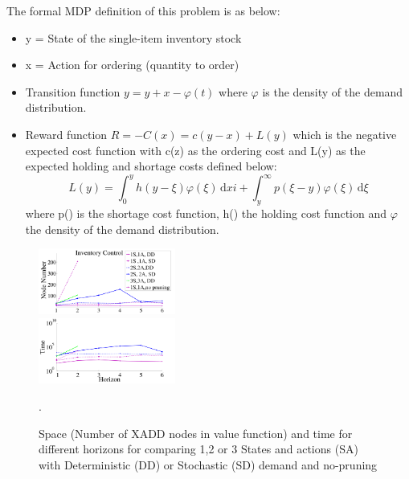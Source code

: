 The formal MDP definition of this problem is as below:
\begin{itemize}
\item y = State of the single-item inventory stock
\item x = Action for ordering (quantity to order) 
\item Transition function $y = y + x - \varphi(t) $ where $\varphi$ is the density of the demand distribution.
\item Reward function $R = -C(x) = c(y-x)+L(y)$ which is the negative expected cost function with c(z) as the ordering cost and L(y) as the expected holding and shortage costs defined below: 
\[ 
L(y) =\int_0^y \! h(y-\xi)\varphi(\xi) \, \mathrm{d} xi + \int_y^{\infty} \! p(\xi - y)\varphi(\xi) \, \mathrm{d} \xi 
\]
where p() is the shortage cost function, h() the holding cost function and $\varphi$ the density of the demand distribution. 
\end{itemize}


\begin{figure}[t]
\includegraphics[width=0.4\textwidth]{new_pics/space1.pdf}\\
\includegraphics[width=0.4\textwidth]{new_pics/time1.pdf}
\vspace{-2mm}
\caption{\footnotesize Space (Number of XADD nodes in value function) 
and time for different horizons for \InventoryControl comparing 
1,2 or 3 States and actions (SA) with Deterministic (DD) 
or Stochastic (SD) demand and no-pruning}.
\label{fig:invC}
\end{figure}

